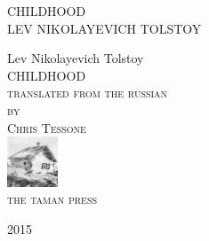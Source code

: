 
\newlength{\drop}\setlength{\drop}{0.12\textheight}

\newcommand*{\firsttitle}{\begingroup
\centering
\vspace*{3em}
{\Large CHILDHOOD}\\[\baselineskip]
{\Large LEV NIKOLAYEVICH TOLSTOY}
\vfill\null
\endgroup}

\newcommand*{\titleAM}{\begingroup
\centering
\vspace*{\drop}
{\large Lev Nikolayevich Tolstoy}\\[\baselineskip]
{\Huge CHILDHOOD}\\[\baselineskip]
{\scshape translated from the russian}\\
{\scshape by}\\
{\scshape Chris Tessone}\\
\vfill%
{\scshape \includegraphics[width=1.5cm, height=1.5cm]{taman-press.png}}\\[0.5\baselineskip]
{\small\scshape the taman press}\par
{\small\scshape 2015}\par
\vfill\null
\endgroup}

\firsttitle
\thispagestyle{empty}
\clearpage

\newpage\null\thispagestyle{empty}\newpage

\titleAM
\thispagestyle{empty}
\clearpage 
